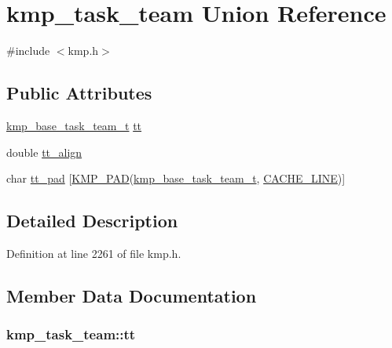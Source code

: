 \hypertarget{unionkmp__task__team}{\section{kmp\-\_\-task\-\_\-team Union Reference}
\label{unionkmp__task__team}
}


{\ttfamily \#include $<$kmp.\-h$>$}

\subsection*{Public Attributes}
\begin{DoxyCompactItemize}
\item 
\hyperlink{kmp_8h_a3cdf3395131112170618173dc9728607}{kmp\-\_\-base\-\_\-task\-\_\-team\-\_\-t} \hyperlink{unionkmp__task__team_a18728e49ce76f29250a4be77cd7a2ff4}{tt}
\item 
double \hyperlink{unionkmp__task__team_a0acf8ce5539332e0a9c56d28e8361b65}{tt\-\_\-align}
\item 
char \hyperlink{unionkmp__task__team_a030ee1dc84827a068fa846a15e745786}{tt\-\_\-pad} \mbox{[}\hyperlink{kmp__lock_8h_a7e782410115489f45ab1686c39a2bb89}{K\-M\-P\-\_\-\-P\-A\-D}(\hyperlink{kmp_8h_a3cdf3395131112170618173dc9728607}{kmp\-\_\-base\-\_\-task\-\_\-team\-\_\-t}, \hyperlink{kmp__os_8h_a86194c659a2d795e5f5949d293ae4661}{C\-A\-C\-H\-E\-\_\-\-L\-I\-N\-E})\mbox{]}
\end{DoxyCompactItemize}


\subsection{Detailed Description}


Definition at line 2261 of file kmp.\-h.



\subsection{Member Data Documentation}
\hypertarget{unionkmp__task__team_a18728e49ce76f29250a4be77cd7a2ff4}{
\subsubsection[{tt}]{ kmp\-\_\-task\-\_\-team\-::tt}}\label{unionkmp__task__team_a18728e49ce76f29250a4be77cd7a2ff4}


